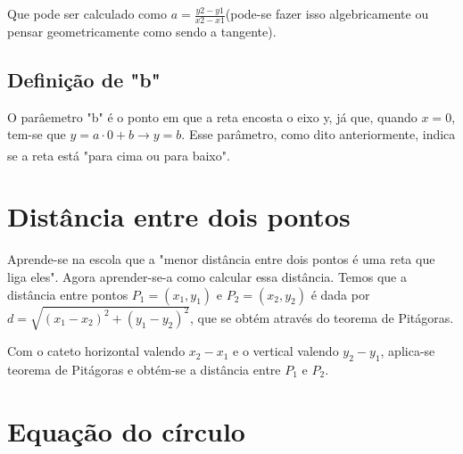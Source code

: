 \documentclass{article}
\begin{document}
Que pode ser calculado como $a = \frac{y2 -y1}{x2- x1}$(pode-se fazer isso algebricamente ou pensar geometricamente como sendo a tangente).

\subsection{Definição de "b"}

O parâemetro "b" é o ponto em que a reta encosta o eixo y, já que, quando $x = 0$, tem-se que $y = a \cdot 0 + b \xrightarrow[]{} y = b.$ Esse parâmetro, como dito anteriormente, indica se a reta está "para cima ou para baixo".

\section{Distância entre dois pontos}

Aprende-se na escola que a "menor distância entre dois pontos é uma  reta que liga eles". Agora aprender-se-a como calcular essa distância. Temos que a distância entre pontos $P_1 = (x_1,y_1)$ e $P_2 = (x_2, y_2)$ é dada por $d = \sqrt{(x_1-x_2)^2 + (y_1-y_2)^2}$, que se obtém através do teorema de Pitágoras.
\begin{center}
\end{center}

Com o cateto horizontal valendo $x_2 - x_1$ e o vertical valendo $y_2 - y_1$, aplica-se teorema de Pitágoras e obtém-se a distância entre $P_1 $ e $P_2$.

\section{Equação do círculo}
\end{document}
